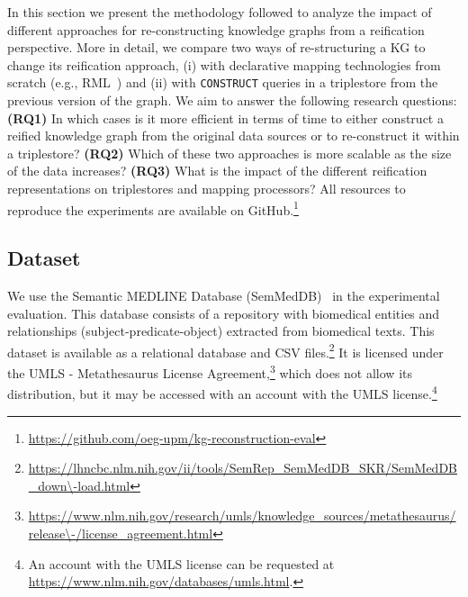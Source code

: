 In this section we present the methodology followed to analyze the impact of different approaches for re-constructing knowledge graphs from a reification perspective. More in detail, we compare two ways of re-structuring a KG to change its reification approach, (i) with declarative mapping technologies from scratch (e.g., RML~\citep{Dimou2014rml,iglesias2023rml}) and (ii) with \texttt{CONSTRUCT} queries in a triplestore from the previous version of the graph. We aim to answer the following research questions: 
\textbf{(RQ1)} In which cases is it more efficient in terms of time to either construct a reified knowledge graph from the original data sources or to re-construct it within a triplestore?
\textbf{(RQ2)} Which of these two approaches is more scalable as the size of the data increases?
\textbf{(RQ3)} What is the impact of the different reification representations on triplestores and mapping processors?
All resources to reproduce the experiments are available on GitHub.\footnote{\url{https://github.com/oeg-upm/kg-reconstruction-eval}}



\subsection{Dataset}
\label{sec:chp6-1_dataset}


We use the Semantic MEDLINE Database (SemMedDB)~\citep{SemMedDB} in the experimental evaluation. This database consists of a repository with biomedical entities and relationships (subject-predicate-object) extracted from biomedical texts.
This dataset is available as a relational database and CSV files.\footnote{\url{https://lhncbc.nlm.nih.gov/ii/tools/SemRep\_SemMedDB\_SKR/SemMedDB\_down\-load.html}}
It is licensed under the UMLS - Metathesaurus License Agreement,\footnote{\url{https://www.nlm.nih.gov/research/umls/knowledge\_sources/metathesaurus/release\-/license\_agreement.html}} which does not allow its distribution, but it may be accessed with an account with the UMLS license.\footnote{An account with the UMLS license can be requested at \url{https://www.nlm.nih.gov/databases/umls.html}.}


